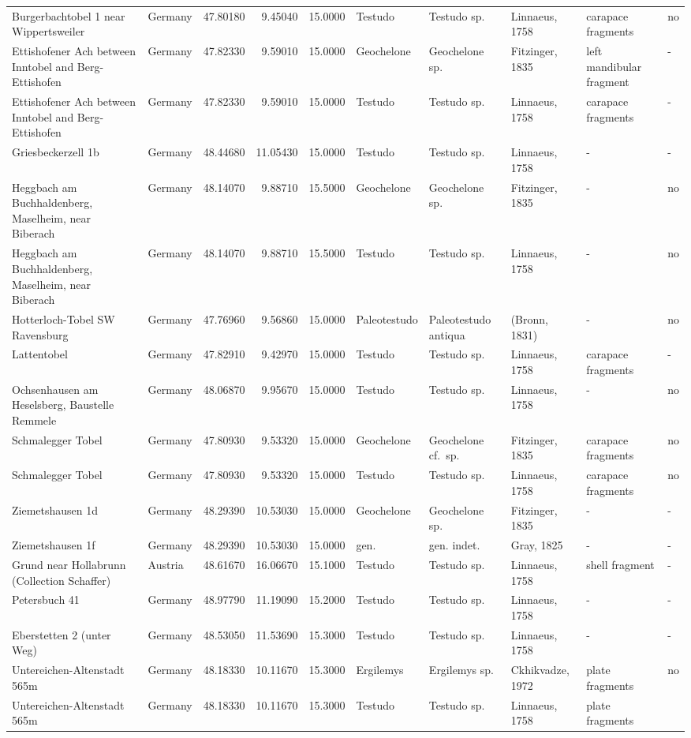 \documentclass[]{article}
\begin{document}
\begin{longtable}[]{@{}llrrrlllll@{}}
Burgerbachtobel 1 near Wippertsweiler & Germany & 47.80180 & 9.45040 &
15.0000 & Testudo & Testudo sp. & Linnaeus, 1758 & carapace fragments &
no\tabularnewline
Ettishofener Ach between Inntobel and Berg-Ettishofen & Germany &
47.82330 & 9.59010 & 15.0000 & Geochelone & Geochelone sp. & Fitzinger,
1835 & left mandibular fragment & -\tabularnewline
Ettishofener Ach between Inntobel and Berg-Ettishofen & Germany &
47.82330 & 9.59010 & 15.0000 & Testudo & Testudo sp. & Linnaeus, 1758 &
carapace fragments & -\tabularnewline
Griesbeckerzell 1b & Germany & 48.44680 & 11.05430 & 15.0000 & Testudo &
Testudo sp. & Linnaeus, 1758 & - & -\tabularnewline
Heggbach am Buchhaldenberg, Maselheim, near Biberach & Germany &
48.14070 & 9.88710 & 15.5000 & Geochelone & Geochelone sp. & Fitzinger,
1835 & - & no\tabularnewline
Heggbach am Buchhaldenberg, Maselheim, near Biberach & Germany &
48.14070 & 9.88710 & 15.5000 & Testudo & Testudo sp. & Linnaeus, 1758 &
- & no\tabularnewline
Hotterloch-Tobel SW Ravensburg & Germany & 47.76960 & 9.56860 & 15.0000
& Paleotestudo & Paleotestudo antiqua & (Bronn, 1831) & - &
no\tabularnewline
Lattentobel & Germany & 47.82910 & 9.42970 & 15.0000 & Testudo & Testudo
sp. & Linnaeus, 1758 & carapace fragments & -\tabularnewline
Ochsenhausen am Heselsberg, Baustelle Remmele & Germany & 48.06870 &
9.95670 & 15.0000 & Testudo & Testudo sp. & Linnaeus, 1758 & - &
no\tabularnewline
Schmalegger Tobel & Germany & 47.80930 & 9.53320 & 15.0000 & Geochelone
& Geochelone cf.~sp. & Fitzinger, 1835 & carapace fragments &
no\tabularnewline
Schmalegger Tobel & Germany & 47.80930 & 9.53320 & 15.0000 & Testudo &
Testudo sp. & Linnaeus, 1758 & carapace fragments & no\tabularnewline
Ziemetshausen 1d & Germany & 48.29390 & 10.53030 & 15.0000 & Geochelone
& Geochelone sp. & Fitzinger, 1835 & - & -\tabularnewline
Ziemetshausen 1f & Germany & 48.29390 & 10.53030 & 15.0000 & gen. & gen.
indet. & Gray, 1825 & - & -\tabularnewline
Grund near Hollabrunn (Collection Schaffer) & Austria & 48.61670 &
16.06670 & 15.1000 & Testudo & Testudo sp. & Linnaeus, 1758 & shell
fragment & -\tabularnewline
Petersbuch 41 & Germany & 48.97790 & 11.19090 & 15.2000 & Testudo &
Testudo sp. & Linnaeus, 1758 & - & -\tabularnewline
Eberstetten 2 (unter Weg) & Germany & 48.53050 & 11.53690 & 15.3000 &
Testudo & Testudo sp. & Linnaeus, 1758 & - & -\tabularnewline
Untereichen-Altenstadt 565m & Germany & 48.18330 & 10.11670 & 15.3000 &
Ergilemys & Ergilemys sp. & Ckhikvadze, 1972 & plate fragments &
no\tabularnewline
Untereichen-Altenstadt 565m & Germany & 48.18330 & 10.11670 & 15.3000 &
Testudo & Testudo sp. & Linnaeus, 1758 & plate fragments &

\end{longtable}
\end{document}
